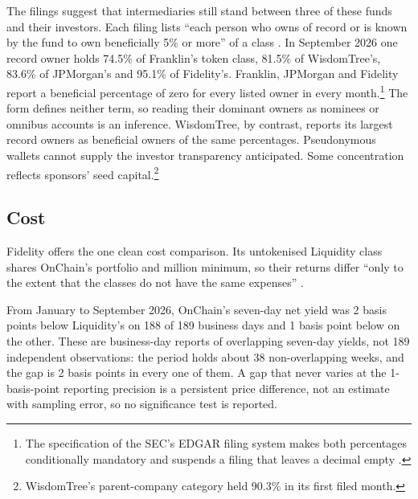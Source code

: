 \documentclass[12pt,a4paper]{article}
\begin{document}
The filings suggest that intermediaries still stand between three of these funds and their investors. Each filing lists ``each person who owns of record or is known by the fund to own beneficially 5\% or more'' of a class \citep[Item B.10, p.~7]{SECFormNMFP}. In September 2026 one record owner holds 74.5\% of Franklin's token class, 81.5\% of WisdomTree's, 83.6\% of JPMorgan's and 95.1\% of Fidelity's. Franklin, JPMorgan and Fidelity report a beneficial percentage of zero for every listed owner in every month.\footnote{The specification of the SEC's EDGAR filing system makes both percentages conditionally mandatory and suspends a filing that leaves a decimal empty \citep[PDF pp.~14, 23]{SECNMFP3TechSpec}.} The form defines neither term, so reading their dominant owners as nominees or omnibus accounts is an inference. WisdomTree, by contrast, reports its largest record owners as beneficial owners of the same percentages. Pseudonymous wallets cannot supply the investor transparency \citet[p.~3]{Yermack2017} anticipated. Some concentration reflects sponsors' seed capital.\footnote{WisdomTree's parent-company category held 90.3\% in its first filed month.}

\subsection{Cost}\label{sec:cost}
Fidelity offers the one clean cost comparison. Its untokenised Liquidity class shares OnChain's portfolio and  million minimum, so their returns differ ``only to the extent that the classes do not have the same expenses'' \citep[Performance]{FidelityTDF2026}.

From January to September 2026, OnChain's seven-day net yield was 2 basis points below Liquidity's on 188 of 189 business days and 1 basis point below on the other. These are business-day reports of overlapping seven-day yields, not 189 independent observations: the period holds about 38 non-overlapping weeks, and the gap is 2 basis points in every one of them. A gap that never varies at the 1-basis-point reporting precision is a persistent price difference, not an estimate with sampling error, so no significance test is reported.
\end{document}
